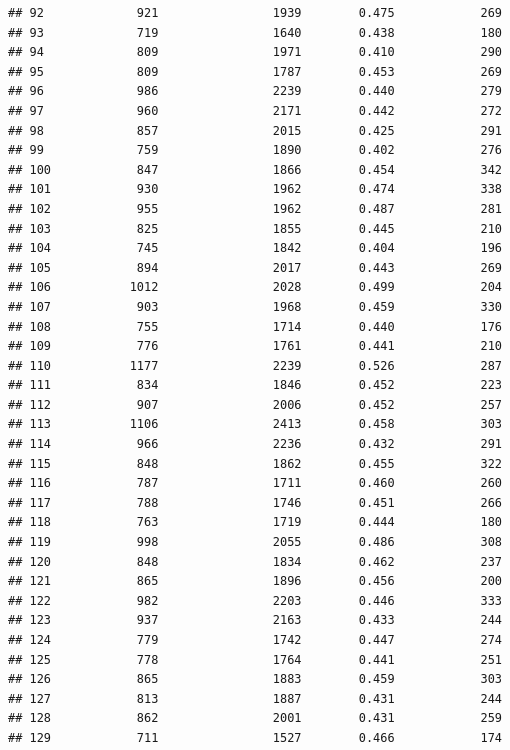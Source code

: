 \documentclass[]{book}
\begin{document}
\begin{verbatim}
## 92             921                1939        0.475            269
## 93             719                1640        0.438            180
## 94             809                1971        0.410            290
## 95             809                1787        0.453            269
## 96             986                2239        0.440            279
## 97             960                2171        0.442            272
## 98             857                2015        0.425            291
## 99             759                1890        0.402            276
## 100            847                1866        0.454            342
## 101            930                1962        0.474            338
## 102            955                1962        0.487            281
## 103            825                1855        0.445            210
## 104            745                1842        0.404            196
## 105            894                2017        0.443            269
## 106           1012                2028        0.499            204
## 107            903                1968        0.459            330
## 108            755                1714        0.440            176
## 109            776                1761        0.441            210
## 110           1177                2239        0.526            287
## 111            834                1846        0.452            223
## 112            907                2006        0.452            257
## 113           1106                2413        0.458            303
## 114            966                2236        0.432            291
## 115            848                1862        0.455            322
## 116            787                1711        0.460            260
## 117            788                1746        0.451            266
## 118            763                1719        0.444            180
## 119            998                2055        0.486            308
## 120            848                1834        0.462            237
## 121            865                1896        0.456            200
## 122            982                2203        0.446            333
## 123            937                2163        0.433            244
## 124            779                1742        0.447            274
## 125            778                1764        0.441            251
## 126            865                1883        0.459            303
## 127            813                1887        0.431            244
## 128            862                2001        0.431            259
## 129            711                1527        0.466            174

\end{verbatim}
\end{document}
